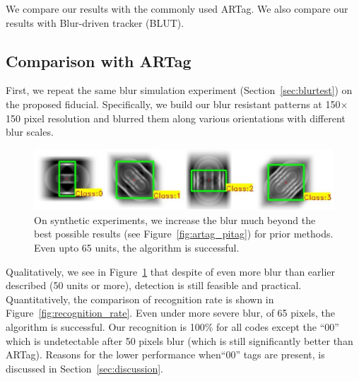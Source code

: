 \documentclass[10pt,twocolumn,letterpaper]{article}
\begin{document}

We compare our results with the commonly used ARTag. We also compare
our results with Blur-driven tracker (BLUT)\cite{Wu:2011}.

\subsection{Comparison with ARTag}
First, we repeat the same blur simulation experiment
(Section~\ref{sec:blurtest}) on the proposed fiducial. Specifically,
we build our blur resistant patterns at 150$\times$150 pixel
resolution and blurred them along various orientations with different
blur scales. 

\begin{figure}[t!]
  \includegraphics[width=\linewidth]{images/blur_maximum.pdf}
  \caption{On synthetic experiments, we increase the blur much beyond
    the best possible results (see Figure~\ref{fig:artag_pitag}) for
    prior methods. Even upto 65 units, the algorithm is successful.}
  \label{fig:blur_maximum}
\end{figure}

Qualitatively, we see in Figure~\ref{fig:blur_maximum} that despite of
even more blur than earlier described (50 units or more), detection is
still feasible and practical.  Quantitatively, the comparison of
recognition rate is shown in Figure~\ref{fig:recognition_rate}.
Even under more severe blur, of 65 pixels, the algorithm is
successful.  Our recognition is 100\% for all codes except the ``00''
which is undetectable after 50 pixels blur (which is still
significantly better than ARTag).  Reasons for the lower performance
when``00'' tags are present, is discussed in
Section~\ref{sec:discussion}.
\end{document}
